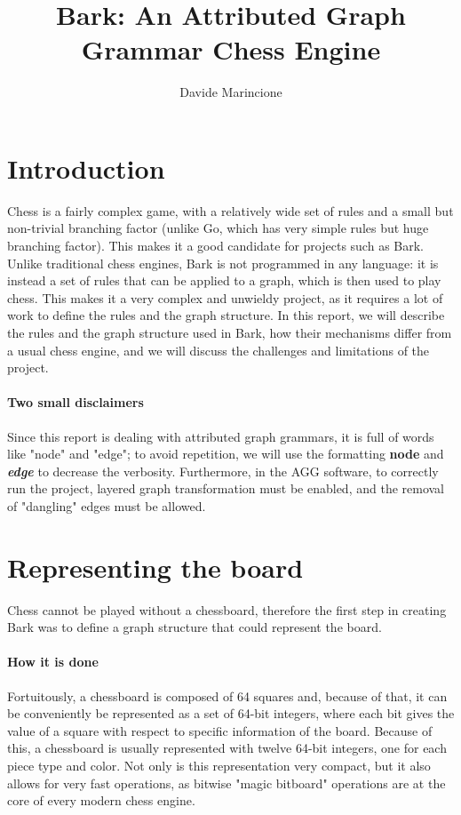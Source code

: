\documentclass[a4paper, 10pt]{scrartcl}
\title{Bark: An Attributed Graph Grammar Chess Engine}
\author{Davide Marincione}
\newcommand{\noderepr}[1]{\textsf{\textbf{#1}}}
\newcommand{\edgerepr}[1]{\textit{\textbf{#1}}}
\begin{document}
    \maketitle
    \section{Introduction}
    Chess is a fairly complex game, with a relatively wide set of rules and a small but non-trivial branching factor (unlike Go, which has very simple rules but huge branching factor). This makes it a good candidate for projects such as Bark. Unlike traditional chess engines, Bark is not programmed in any language: it is instead a set of rules that can be applied to a graph, which is then used to play chess. This makes it a very complex and unwieldy project, as it requires a lot of work to define the rules and the graph structure. In this report, we will describe the rules and the graph structure used in Bark, how their mechanisms differ from a usual chess engine, and we will discuss the challenges and limitations of the project.

    \paragraph{Two small disclaimers} Since this report is dealing with attributed graph grammars, it is full of words like "node" and "edge"; to avoid repetition, we will use the formatting \noderepr{node} and \edgerepr{edge} to decrease the verbosity. Furthermore, in the AGG software, to correctly run the project, layered graph transformation must be enabled, and the removal of "dangling" edges must be allowed.

    \section{Representing the board}
    Chess cannot be played without a chessboard, therefore the first step in creating Bark was to define a graph structure that could represent the board.
    \paragraph{How it is done} Fortuitously, a chessboard is composed of 64 squares and, because of that, it can be conveniently be represented as a set of 64-bit integers, where each bit gives the value of a square with respect to specific information of the board. Because of this, a chessboard is usually represented with twelve 64-bit integers, one for each piece type and color. Not only is this representation very compact, but it also allows for very fast operations, as bitwise "magic bitboard" operations are at the core of every modern chess engine.
\end{document}

